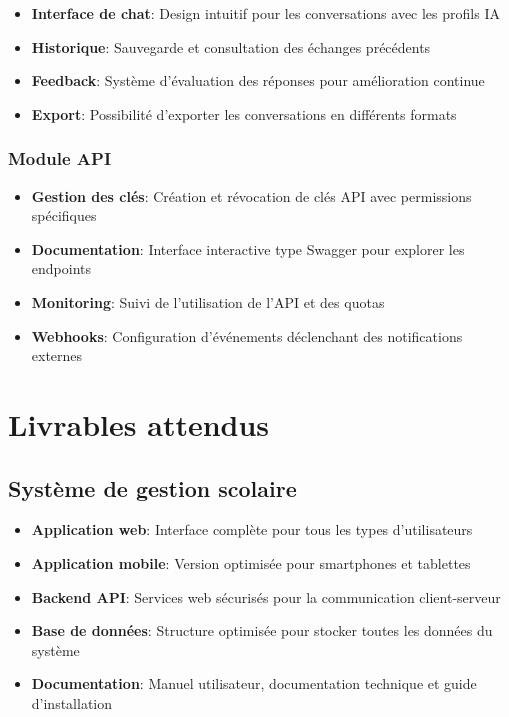 \begin{itemize}
  \item \textbf{Interface de chat}: Design intuitif pour les conversations avec les profils IA
  
  \item \textbf{Historique}: Sauvegarde et consultation des échanges précédents
  
  \item \textbf{Feedback}: Système d'évaluation des réponses pour amélioration continue
  
  \item \textbf{Export}: Possibilité d'exporter les conversations en différents formats
\end{itemize}

\subsubsection{Module API}

\begin{itemize}
  \item \textbf{Gestion des clés}: Création et révocation de clés API avec permissions spécifiques
  
  \item \textbf{Documentation}: Interface interactive type Swagger pour explorer les endpoints
  
  \item \textbf{Monitoring}: Suivi de l'utilisation de l'API et des quotas
  
  \item \textbf{Webhooks}: Configuration d'événements déclenchant des notifications externes
\end{itemize}

\section{Livrables attendus}

\subsection{Système de gestion scolaire}

\begin{itemize}
  \item \textbf{Application web}: Interface complète pour tous les types d'utilisateurs
  
  \item \textbf{Application mobile}: Version optimisée pour smartphones et tablettes
  
  \item \textbf{Backend API}: Services web sécurisés pour la communication client-serveur
  
  \item \textbf{Base de données}: Structure optimisée pour stocker toutes les données du système
  
  \item \textbf{Documentation}: Manuel utilisateur, documentation technique et guide d'installation
\end{itemize}

